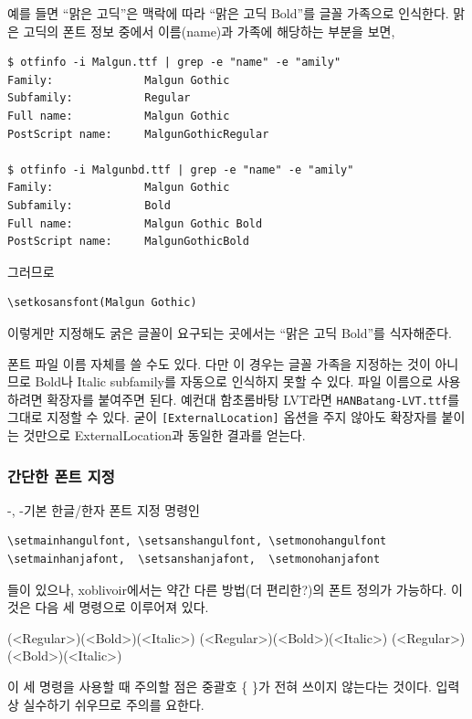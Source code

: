 \documentclass[
	12pt,
	a4paper,
	kosection,
	footnote,
	nobookmarks,
	microtype,
	figtabcapt,
]{oblivoir}
\def\oblivoirdblquote#1{``#1''}
\newcommand\xobclass{x\-ob\-liv\-oir\oblivoirallowbreak}
\begin{document}
예를 들면
\oblivoirdblquote{맑은 고딕}은 맥락에 따라 \oblivoirdblquote{맑은 고딕 Bold}를
글꼴 가족으로 인식한다. 맑은 고딕의 폰트 정보 중에서 이름(name)과 가족에 해당하는 부분을 보면,
\begin{verbatim}
$ otfinfo -i Malgun.ttf | grep -e "name" -e "amily"
Family:              Malgun Gothic
Subfamily:           Regular
Full name:           Malgun Gothic
PostScript name:     MalgunGothicRegular

$ otfinfo -i Malgunbd.ttf | grep -e "name" -e "amily"
Family:              Malgun Gothic
Subfamily:           Bold
Full name:           Malgun Gothic Bold
PostScript name:     MalgunGothicBold
\end{verbatim}

그러므로
\begin{verbatim}
\setkosansfont(Malgun Gothic)
\end{verbatim}
이렇게만 지정해도 굵은 글꼴이 요구되는 곳에서는 \oblivoirdblquote{맑은 고딕 Bold}를
식자해준다.

폰트 파일 이름 자체를 쓸 수도 있다. 다만 이 경우는 글꼴 가족을 지정하는 것이 아니므로 Bold나 Italic subfamily를
자동으로 인식하지 못할 수 있다. 파일 이름으로 사용하려면 확장자를 붙여주면 된다. 예컨대 함초롬바탕 LVT라면
\texttt{HANBatang-LVT.ttf}를 그대로 지정할 수 있다. 굳이 \texttt{[ExternalLocation]} 옵션을 주지
않아도 확장자를 붙이는 것만으로 ExternalLocation과 동일한 결과를 얻는다.

\subsubsection{간단한 폰트 지정}

\XeTeX-\ko, \LuaTeX- 기본 한글/한자 폰트 지정 명령인
\begin{verbatim}
\setmainhangulfont, \setsanshangulfont, \setmonohangulfont
\setmainhanjafont,  \setsanshanjafont,  \setmonohanjafont
\end{verbatim}
들이 있으나, 
\xobclass 에서는 약간 다른 방법(더 편리한?)의 폰트 정의가
가능하다. 이것은 다음 세 명령으로 이루어져 있다.
\begin{boxedverbatim}
\setkomainfont[<basename>](<Regular>)(<Bold>)(<Italic>)
\setkosansfont[<basename>](<Regular>)(<Bold>)(<Italic>)
\setkomonofont[<basename>](<Regular>)(<Bold>)(<Italic>)
\end{boxedverbatim}

이 세 명령을 사용할 때 주의할 점은 중괄호 \{ \}가 전혀 쓰이지 않는다는 것이다.
입력상 실수하기 쉬우므로 주의를 요한다.
\end{document}
